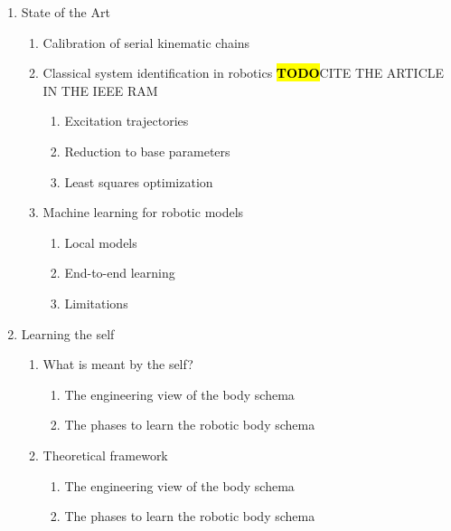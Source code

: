 \documentclass[12pt, a4paper]{article}
\newcommand{\TODO}{\hl{\textbf{TODO}}}
\begin{document}
\begin{enumerate}
	\item State of the Art
	\begin{enumerate}
		\item Calibration of serial kinematic chains  
		\item Classical system identification in robotics
		\newline\TODO CITE THE ARTICLE IN THE IEEE RAM
		
		\begin{enumerate}
			\item Excitation trajectories
			\item Reduction to base parameters
			\item Least squares optimization
		\end{enumerate}
		
		\item Machine learning for robotic models
		\begin{enumerate}
			\item Local models
			\item End-to-end learning
			\item Limitations
		\end{enumerate}	
	\end{enumerate}
	
	\item Learning the self
	\begin{enumerate}
			\item What is meant by the self?
			\begin{enumerate}
				\item The engineering view of the body schema
				\item The phases to learn the robotic body schema
			\end{enumerate}

	\item Theoretical framework
	\begin{enumerate}
		\item The engineering view of the body schema
		\item The phases to learn the robotic body schema
	\end{enumerate}
		
	\end{enumerate}
\end{enumerate}

\end{document}
